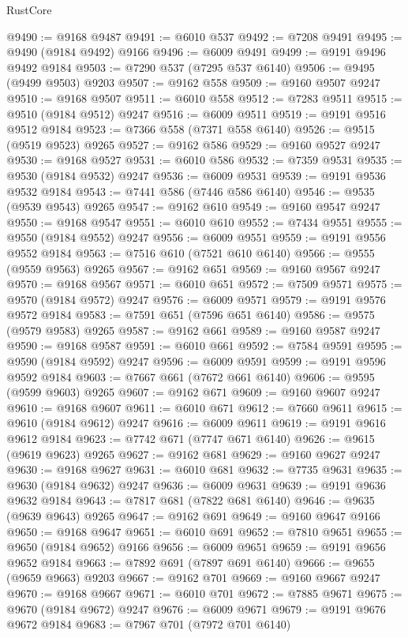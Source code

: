 \begin{lexlean}{RustCore}
\begin{coremodule}
@9490 := @9168 @9487
@9491 := @6010 @537
@9492 := @7208 @9491
@9495 := @9490 (@9184 @9492) @9166
@9496 := @6009 @9491
@9499 := @9191 @9496 @9492 @9184
@9503 := @7290 @537 (@7295 @537 @6140)
@9506 := @9495 (@9499 @9503) @9203
@9507 := @9162 @558
@9509 := @9160 @9507 @9247
@9510 := @9168 @9507
@9511 := @6010 @558
@9512 := @7283 @9511
@9515 := @9510 (@9184 @9512) @9247
@9516 := @6009 @9511
@9519 := @9191 @9516 @9512 @9184
@9523 := @7366 @558 (@7371 @558 @6140)
@9526 := @9515 (@9519 @9523) @9265
@9527 := @9162 @586
@9529 := @9160 @9527 @9247
@9530 := @9168 @9527
@9531 := @6010 @586
@9532 := @7359 @9531
@9535 := @9530 (@9184 @9532) @9247
@9536 := @6009 @9531
@9539 := @9191 @9536 @9532 @9184
@9543 := @7441 @586 (@7446 @586 @6140)
@9546 := @9535 (@9539 @9543) @9265
@9547 := @9162 @610
@9549 := @9160 @9547 @9247
@9550 := @9168 @9547
@9551 := @6010 @610
@9552 := @7434 @9551
@9555 := @9550 (@9184 @9552) @9247
@9556 := @6009 @9551
@9559 := @9191 @9556 @9552 @9184
@9563 := @7516 @610 (@7521 @610 @6140)
@9566 := @9555 (@9559 @9563) @9265
@9567 := @9162 @651
@9569 := @9160 @9567 @9247
@9570 := @9168 @9567
@9571 := @6010 @651
@9572 := @7509 @9571
@9575 := @9570 (@9184 @9572) @9247
@9576 := @6009 @9571
@9579 := @9191 @9576 @9572 @9184
@9583 := @7591 @651 (@7596 @651 @6140)
@9586 := @9575 (@9579 @9583) @9265
@9587 := @9162 @661
@9589 := @9160 @9587 @9247
@9590 := @9168 @9587
@9591 := @6010 @661
@9592 := @7584 @9591
@9595 := @9590 (@9184 @9592) @9247
@9596 := @6009 @9591
@9599 := @9191 @9596 @9592 @9184
@9603 := @7667 @661 (@7672 @661 @6140)
@9606 := @9595 (@9599 @9603) @9265
@9607 := @9162 @671
@9609 := @9160 @9607 @9247
@9610 := @9168 @9607
@9611 := @6010 @671
@9612 := @7660 @9611
@9615 := @9610 (@9184 @9612) @9247
@9616 := @6009 @9611
@9619 := @9191 @9616 @9612 @9184
@9623 := @7742 @671 (@7747 @671 @6140)
@9626 := @9615 (@9619 @9623) @9265
@9627 := @9162 @681
@9629 := @9160 @9627 @9247
@9630 := @9168 @9627
@9631 := @6010 @681
@9632 := @7735 @9631
@9635 := @9630 (@9184 @9632) @9247
@9636 := @6009 @9631
@9639 := @9191 @9636 @9632 @9184
@9643 := @7817 @681 (@7822 @681 @6140)
@9646 := @9635 (@9639 @9643) @9265
@9647 := @9162 @691
@9649 := @9160 @9647 @9166
@9650 := @9168 @9647
@9651 := @6010 @691
@9652 := @7810 @9651
@9655 := @9650 (@9184 @9652) @9166
@9656 := @6009 @9651
@9659 := @9191 @9656 @9652 @9184
@9663 := @7892 @691 (@7897 @691 @6140)
@9666 := @9655 (@9659 @9663) @9203
@9667 := @9162 @701
@9669 := @9160 @9667 @9247
@9670 := @9168 @9667
@9671 := @6010 @701
@9672 := @7885 @9671
@9675 := @9670 (@9184 @9672) @9247
@9676 := @6009 @9671
@9679 := @9191 @9676 @9672 @9184
@9683 := @7967 @701 (@7972 @701 @6140)

\end{coremodule}
\end{lexlean}
